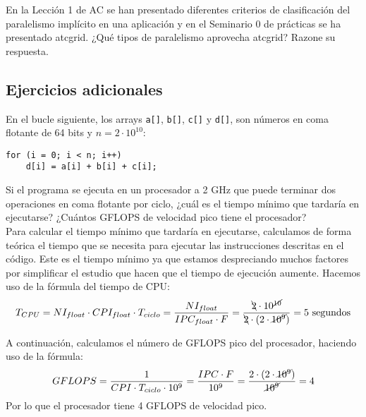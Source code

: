 \begin{cuestion}
    En la Lección 1 de AC se han presentado diferentes criterios de clasificación del paralelismo implícito
    en una aplicación y en el Seminario 0 de prácticas se ha presentado atcgrid. ¿Qué tipos de paralelismo
    aprovecha atcgrid? Razone su respuesta.
\end{cuestion}

\subsection{Ejercicios adicionales}
\begin{ejercicio}
    En el bucle siguiente, los arrays \verb|a[]|, \verb|b[]|, \verb|c[]| y \verb|d[]|, son números en coma flotante de 64 bits y $n = 2\cdot 10^{10}$:
    \begin{verbatim}
for (i = 0; i < n; i++)
    d[i] = a[i] + b[i] + c[i];
    \end{verbatim}

    Si el programa se ejecuta en un procesador a 2 GHz que puede terminar dos operaciones en coma flotante por ciclo, ¿cuál es el tiempo mínimo que tardaría en ejecutarse? ¿Cuántos GFLOPS de velocidad pico tiene el procesador?\\

    Para calcular el tiempo mínimo que tardaría en ejecutarse, calculamos de forma teórica el tiempo que se necesita para ejecutar las instrucciones descritas en el código. Este es el tiempo mínimo ya que estamos despreciando muchos factores por simplificar el estudio que hacen que el tiempo de ejecución aumente. Hacemos uso de la fórmula del tiempo de CPU:
    \begin{equation*}
        T_{CPU} = NI_{float} \cdot CPI_{float} \cdot T_{ciclo} = \dfrac{NI_{float}}{IPC_{float} \cdot F} = \dfrac{\bcancel{2}\cdot 10^{\cancel{10}}}{\bcancel{2} \cdot (2\cdot \cancel{10^9})} = 5 \text{\ segundos}
    \end{equation*}

    A continuación, calculamos el número de GFLOPS pico del procesador, haciendo uso de la fórmula:
    \begin{equation*}
    GFLOPS = \dfrac{1}{CPI \cdot T_{ciclo} \cdot 10^9} = \dfrac{IPC \cdot F}{10^9} = \dfrac{2 \cdot (2 \cdot \cancel{10^9})}{\cancel{10^9}} = 4
    \end{equation*}
    Por lo que el procesador tiene 4 GFLOPS de velocidad pico.
\end{ejercicio}

